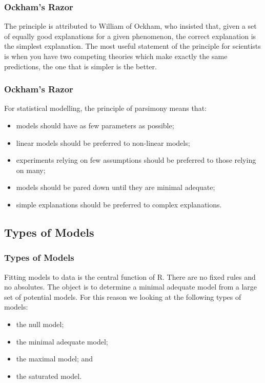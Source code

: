 \begin{frame}\frametitle{Ockham's Razor}
The principle is attributed to William of Ockham, who insisted that, given a set of equally good explanations
for a given phenomenon, the correct explanation is the simplest explanation. The most useful statement of the principle for scientists is when you have two competing theories which make exactly the same predictions, the one that is simpler is the better.
\end{frame}

\begin{frame}\frametitle{Ockham's Razor}
For statistical modelling, the principle of
parsimony means that:
\begin{itemize}
\item models should have as few parameters as possible;
\item linear models should be preferred to non-linear models;
\item experiments relying on few assumptions should be preferred to those relying on many;
\item models should be pared down until they are minimal adequate;
\item simple explanations should be preferred to complex explanations.
\end{itemize}
\end{frame}

\subsection{Types of Models}
\begin{frame}\frametitle{Types of Models}
Fitting models to data is the central function of R. There are no fixed rules and no absolutes. The object is to determine a minimal adequate model from a large set of potential models. For this reason we looking at the following types of models: 
\begin{itemize}
\item the null model;
\item the minimal adequate model;
\item the maximal model; and
\item the saturated model.
\end{itemize}
\end{frame}

